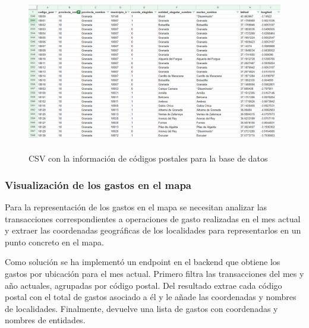 \begin{figure}[ht!]
    \centering
    \includegraphics[height=70mm]{imagenes/municipios_cp.png}
    \caption{CSV con la información de códigos postales para la base de datos}
    \label{fig:CSV_municipios}
\end{figure}


\subsubsection{Visualización de los gastos en el mapa}
Para la representación de los gastos en el mapa se necesitan analizar las transacciones correspondientes a operaciones de gasto realizadas en el mes actual y extraer las coordenadas geográficas de los localidades para representarlos en un punto concreto en el mapa. 

Como solución se ha implementó un endpoint en el backend que obtiene los gastos por ubicación para el mes actual. Primero filtra las transacciones del mes y año actuales, agrupadas por código postal. Del resultado extrae cada código postal con el total de gastos asociado a él y le añade las coordenadas y nombres de localidades. Finalmente, devuelve una lista de gastos con coordenadas y nombres de entidades.


